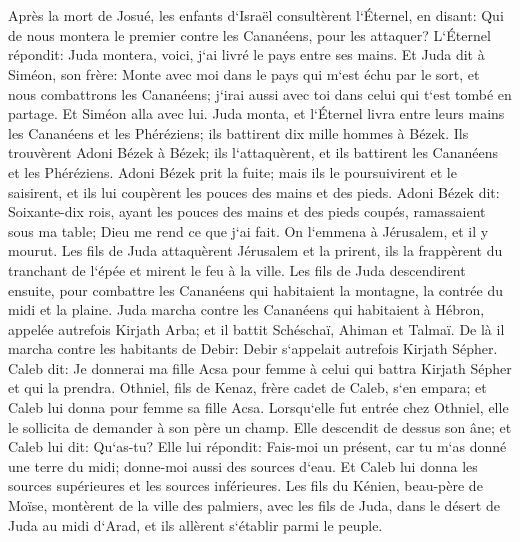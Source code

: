 

\chapter{}

\verse Après la mort de Josué, les enfants d`Israël consultèrent l`Éternel, en disant: Qui de nous montera le premier contre les Cananéens, pour les attaquer? 
\verse L`Éternel répondit: Juda montera, voici, j`ai livré le pays entre ses mains. 
\verse Et Juda dit à Siméon, son frère: Monte avec moi dans le pays qui m`est échu par le sort, et nous combattrons les Cananéens; j`irai aussi avec toi dans celui qui t`est tombé en partage. Et Siméon alla avec lui. 
\verse Juda monta, et l`Éternel livra entre leurs mains les Cananéens et les Phéréziens; ils battirent dix mille hommes à Bézek. 
\verse Ils trouvèrent Adoni Bézek à Bézek; ils l`attaquèrent, et ils battirent les Cananéens et les Phéréziens. 
\verse Adoni Bézek prit la fuite; mais ils le poursuivirent et le saisirent, et ils lui coupèrent les pouces des mains et des pieds. 
\verse Adoni Bézek dit: Soixante-dix rois, ayant les pouces des mains et des pieds coupés, ramassaient sous ma table; Dieu me rend ce que j`ai fait. On l`emmena à Jérusalem, et il y mourut. 
\verse Les fils de Juda attaquèrent Jérusalem et la prirent, ils la frappèrent du tranchant de l`épée et mirent le feu à la ville. 
\verse Les fils de Juda descendirent ensuite, pour combattre les Cananéens qui habitaient la montagne, la contrée du midi et la plaine. 
\verse Juda marcha contre les Cananéens qui habitaient à Hébron, appelée autrefois Kirjath Arba; et il battit Schéschaï, Ahiman et Talmaï. 
\verse De là il marcha contre les habitants de Debir: Debir s`appelait autrefois Kirjath Sépher. 
\verse Caleb dit: Je donnerai ma fille Acsa pour femme à celui qui battra Kirjath Sépher et qui la prendra. 
\verse Othniel, fils de Kenaz, frère cadet de Caleb, s`en empara; et Caleb lui donna pour femme sa fille Acsa. 
\verse Lorsqu`elle fut entrée chez Othniel, elle le sollicita de demander à son père un champ. Elle descendit de dessus son âne; et Caleb lui dit: Qu`as-tu? 
\verse Elle lui répondit: Fais-moi un présent, car tu m`as donné une terre du midi; donne-moi aussi des sources d`eau. Et Caleb lui donna les sources supérieures et les sources inférieures. 
\verse Les fils du Kénien, beau-père de Moïse, montèrent de la ville des palmiers, avec les fils de Juda, dans le désert de Juda au midi d`Arad, et ils allèrent s`établir parmi le peuple. 
